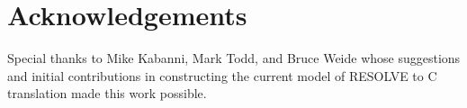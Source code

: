 \section{Acknowledgements}

Special thanks to Mike Kabanni, Mark Todd, and Bruce Weide whose suggestions and initial contributions in constructing the current model of RESOLVE to C translation made this work possible. 